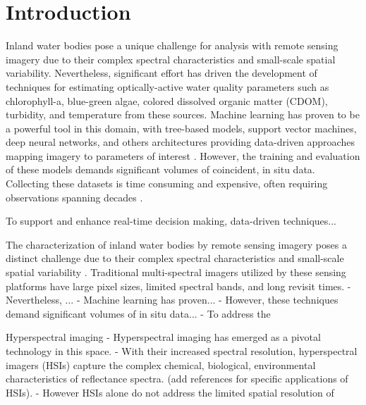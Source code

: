 \documentclass{article}
\begin{document}
\section{Introduction}

Inland water bodies pose a unique challenge for analysis with remote sensing imagery due to their complex spectral characteristics and small-scale spatial variability. Nevertheless, significant effort has driven the development of techniques for estimating optically-active water quality parameters such as chlorophyll-a, blue-green algae, colored dissolved organic matter (CDOM), turbidity, and temperature from these sources\cite{koponen2002lake,ritchie2003remote, bonansea2015using}. Machine learning has proven to be a powerful tool in this domain, with tree-based models, support vector machines, deep neural networks, and others architectures providing data-driven approaches mapping imagery to parameters of interest \cite{thenkabail2018hyperspectral, ghatkar2019classification,sagan2020monitoring}. However, the training and evaluation of these models demands significant volumes of coincident, in situ data. Collecting these datasets is time consuming and expensive, often requiring observations spanning decades \cite{aurin2018remote, ross2019aquasat}. 

To support and enhance real-time decision making, data-driven techniques...


The characterization of inland water bodies by remote sensing imagery poses a distinct challenge due to their complex spectral characteristics and small-scale spatial variability \cite{ritchie2003remote}. Traditional multi-spectral imagers utilized by these sensing platforms have large pixel sizes, limited spectral bands, and long revisit times.
- Nevertheless, ... 
- Machine learning has proven... 
- However, these techniques demand significant volumes of in situ data...
- To address the 

Hyperspectral imaging
- Hyperspectral imaging has emerged as a pivotal technology in this space.
- With their increased spectral resolution, hyperspectral imagers (HSIs) capture the complex chemical, biological, environmental characteristics of reflectance spectra. (add references for specific applications of HSIs). 
- However HSIs alone do not address the limited spatial resolution of 
\end{document}
